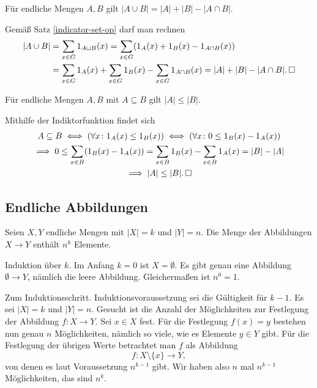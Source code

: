 \begin{Satz}
Für endliche Mengen $A,B$ gilt $|A\cup B| = |A|+|B|-|A\cap B|$.
\end{Satz}
\begin{Beweis}
Gemäß Satz \ref{indicator-set-op} darf man rechnen
\begin{align*}
|A\cup B| &= \sum_{x\in G} 1_{A\cup B}(x)
= \sum_{x\in G} (1_A(x) + 1_B(x) - 1_{A\cap B}(x))\\
&= \sum_{x\in G} 1_A(x) + \sum_{x\in G} 1_B(x) - \sum_{x\in G} 1_{A\cap B}(x)
= |A| + |B| - |A\cap B|.\,\square
\end{align*}
\end{Beweis}

\begin{Satz}
Für endliche Mengen $A,B$ mit $A\subseteq B$ gilt $|A|\le |B|$.
\end{Satz}
\begin{Beweis}
Mithilfe der Indiktorfunktion findet sich
\begin{gather*}
A\subseteq B \iff (\forall x\colon 1_A(x)\le 1_B(x))
\iff (\forall x\colon 0\le 1_B(x)-1_A(x))\\
\implies 0\le \sum_{x\in B}(1_B(x)-1_A(x))
= \sum_{x\in B} 1_B(x) - \sum_{x\in B} 1_A(x) = |B| - |A|\\
\implies |A|\le |B|.\,\square
\end{gather*}
\end{Beweis}

\newpage
\subsection{Endliche Abbildungen}

\begin{Satz}\newlinefirst
Seien $X,Y$ endliche Mengen mit $|X| = k$ und $|Y|=n$. Die Menge
der Abbildungen $X\to Y$ enthält $n^k$ Elemente.
\end{Satz}
\begin{Beweis}
Induktion über $k$. Im Anfang $k=0$ ist $X=\emptyset$. Es gibt genau
eine Abbildung $\emptyset\to Y$, nämlich die leere Abbildung.
Gleichermaßen ist $n^0=1$.

Zum Induktionsschritt. Induktionsvoraussetzung sei die Gültigkeit
für $k-1$. Es  sei $|X|=k$ und $|Y|=n$. Gesucht ist die Anzahl
der Möglichkeiten zur Festlegung der Abbildung $f\colon X\to Y$.
Sei $x\in X$ fest. Für die Festlegung $f(x)=y$ bestehen nun genau $n$
Möglichkeiten, nämlich so viele, wie es Elemente $y\in Y$ gibt.
Für die Festlegung der übrigen Werte betrachtet man $f$ als Abbildung%
\[f\colon X\setminus\{x\}\to Y,\]
von denen es laut Voraussetzung $n^{k-1}$ gibt. Wir haben also
$n$ mal $n^{k-1}$ Möglichkeiten, das sind $n^k$.\,\qedsymbol
\end{Beweis}

